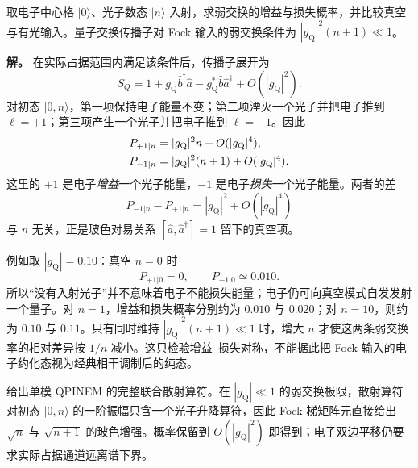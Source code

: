 
\begin{exbox}
取电子中心格 $|0\rangle$、光子数态 $|n\rangle$ 入射，求弱交换的增益与损失概率，并比较真空与有光输入。量子交换传播子对 Fock 输入的弱交换条件为 $|g_{\mathrm Q}|^2(n+1)\ll1$。

\textbf{解。} 在实际占据范围内满足该条件后，传播子展开为
\begin{equation*}
 S_Q
 =1+g_{\mathrm Q}\hat b^\dagger\hat a
 -g_{\mathrm Q}^*\hat b\hat a^\dagger+O(|g_{\mathrm Q}|^2).
\end{equation*}
对初态 $|0,n\rangle$，第一项保持电子能量不变；第二项湮灭一个光子并把电子推到 $\ell=+1$；第三项产生一个光子并把电子推到 $\ell=-1$。因此
\begin{align}
 P_{+1|n}&=|g_{\mathrm Q}|^2n+O(|g_{\mathrm Q}|^4),\notag\\
 P_{-1|n}&=|g_{\mathrm Q}|^2(n+1)+O(|g_{\mathrm Q}|^4).
 \label{eq:qpinem-gain-loss-n-nplus1-dp65}
\end{align}
这里的 $+1$ 是电子\emph{增益}一个光子能量，$-1$ 是电子\emph{损失}一个光子能量。两者的差
\begin{equation}
 {P_{-1|n}-P_{+1|n}=|g_{\mathrm Q}|^2+O(|g_{\mathrm Q}|^4)}
 \label{eq:qpinem-spontaneous-difference-dp65}
\end{equation}
与 $n$ 无关，正是玻色对易关系 $[\hat a,\hat a^\dagger]=1$ 留下的真空项。

例如取 $|g_{\mathrm Q}|=0.10$：真空 $n=0$ 时
\begin{equation*}
 P_{+1|0}=0,
 \qquad
 P_{-1|0}\simeq0.010.
\end{equation*}
所以“没有入射光子”并不意味着电子不能损失能量；电子仍可向真空模式自发发射一个量子。对 $n=1$，增益和损失概率分别约为 $0.010$ 与 $0.020$；对 $n=10$，则约为 $0.10$ 与 $0.11$。只有同时维持 $|g_{\mathrm Q}|^2(n+1)\ll1$ 时，增大 $n$ 才使这两条弱交换率的相对差异按 $1/n$ 减小。这只检验增益--损失对称，不能据此把 Fock 输入的电子约化态视为经典相干调制后的纯态。


\medskip

 给出单模 QPINEM 的完整联合散射算符。在 $|g_{\mathrm Q}|\ll1$ 的弱交换极限，散射算符对初态 $|0,n\rangle$ 的一阶振幅只含一个光子升降算符，因此 Fock 梯矩阵元直接给出 $\sqrt n$ 与 $\sqrt{n+1}$ 的玻色增强。概率保留到 $O(|g_{\mathrm Q}|^2)$ 即得到；电子双边平移仍要求实际占据通道远离谱下界。



\end{exbox}
